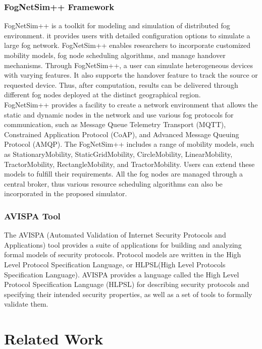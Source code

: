 				\subsubsection{FogNetSim++ Framework}
				FogNetSim++ \cite{qayyum2018fognetsim++} is a toolkit for modeling and simulation of distributed fog environment. it provides users with detailed configuration options to simulate a large fog network. FogNetSim++ enables researchers to incorporate customized mobility models, fog node scheduling algorithms, and manage handover mechanisms. Through FogNetSim++, a user can simulate heterogeneous devices with varying features. It also supports the handover feature to track the source or requested device. Thus, after computation, results can be delivered through different fog nodes deployed at the distinct geographical region. \\
				FogNetSim++ provides a facility to create a network environment that allows the static and dynamic nodes in the network and use various fog protocols for communication, such as Message Queue Telemetry Transport (MQTT), Constrained Application Protocol (CoAP), and Advanced Message Queuing Protocol (AMQP). The FogNetSim++ includes a range of mobility models, such as StationaryMobility, StaticGridMobility, CircleMobility, LinearMobility, TractorMobility, RectangleMobility, and TractorMobility. Users can extend these models to fulfill their requirements. All the fog nodes are managed through a central broker, thus various resource scheduling algorithms can also be incorporated in the proposed simulator.
				
				\subsubsection{AVISPA Tool}
				The AVISPA \cite{vigano2006automated} (Automated Validation of Internet Security Protocols and Applications) tool provides a suite of applications for building and analyzing formal models of security protocols. Protocol models are written in the High Level Protocol Specification Language, or HLPSL(High Level Protocols Specification Language). AVISPA provides a language called the High Level Protocol Specification Language (HLPSL) for describing security protocols and specifying their intended security properties, as well as a set of tools to formally validate them.
		
		\newpage
		\section{Related Work}
